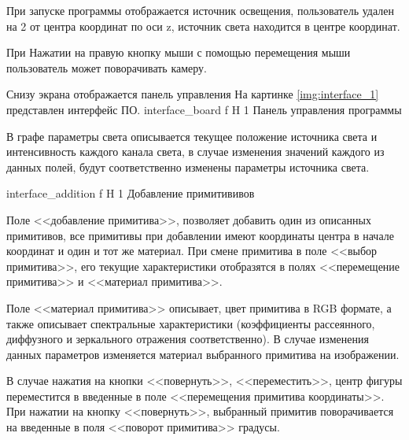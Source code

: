 При запуске программы отображается источник освещения, пользователь удален на 2 от центра координат по оси z, источник света находится в центре координат. 

При Нажатии на правую кнопку мыши с помощью перемещения мыши пользователь может поворачивать камеру.

Снизу экрана отображается панель управления 
На картинке \ref{img:interface_1} представлен интерфейс ПО.
{interface_board} %
{f} %
{H} %
{1\textwidth} %
{Панель управления программы} %

В графе параметры света описывается текущее положение источника света
и интенсивность каждого канала света, в случае изменения значений каждого из данных полей, будут соответственно изменены параметры источника света.

{interface_addition} %
{f} %
{H} %
{1\textwidth} %
{Добавление примитививов} %

Поле <<добавление примитива>>, позволяет добавить один из описанных примитивов, все примитивы при добавлении имеют координаты центра в начале координат и один и тот же материал.
При смене примитива в поле <<выбор примитива>>, его текущие характеристики отобразятся в полях <<перемещение примитива>>  и <<материал примитива>>.

Поле <<материал примитива>> описывает, цвет примитива в RGB формате,
а также описывает спектральные характеристики (коэффициенты рассеянного, диффузного и зеркального отражения соответственно).
В случае изменения данных параметров изменяется материал выбранного примитива на изображении.

В случае нажатия  на кнопки <<повернуть>>, <<переместить>>,
центр фигуры переместится в введенные в поле <<перемещения примитива координаты>>. При нажатии на кнопку <<повернуть>>, выбранный примитив
поворачивается на введенные в поля <<поворот примитива>> градусы.


